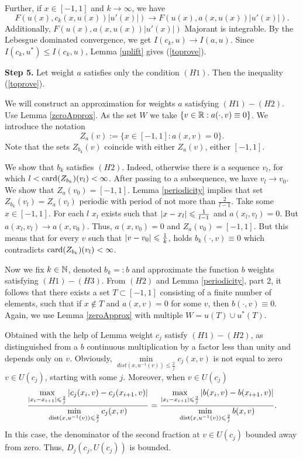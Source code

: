 Further, if $x \in [-1, 1]$ and $k \to \infty$, we have
$$F(u(x), c_k(x, u(x)) |u'(x)|) \to F(u(x), a(x, u(x)) |u'(x)|).$$
Additionally, $F(u(x), a(x, u(x)) |u'(x)|)$ Majorant is integrable.
By the Lebesgue dominated convergence, we get $I(c_k, u) \to I(a, u)$.
Since $I(c_k, u^*) \le I(c_k, u)$, Lemma \ref{uplift} gives (\ref{toprove}).

\bigskip
{\bf Step 5.} Let weight $a$ satisfies only the condition $(H1)$.
Then the inequality (\ref{toprove}).

We will construct an approximation for weights $a$ satisfying $(H1)-(H2)$.
Use Lemma \ref{zeroApprox}.
As the set $W$ we take $\{ v \in \mathbb R: a(\cdot, v) \equiv 0 \}$.
We introduce the notation $$Z_a(v) := \{ x \in [-1, 1]: a(x, v) = 0 \}.$$
Note that the sets $Z_{b_k}(v)$ coincide with either $Z_a(v)$, either $[-1, 1]$.

We show that $b_k$ satisfies $(H2)$.
Indeed, otherwise there is a sequence $v_l$, for which
$l < {\rm card}(Z_{b_k})(v_l) < \infty$.
After passing to a subsequence, we have $v_l \to v_0$.
We show that $Z_a(v_0) = [-1, 1]$. Lemma \ref{periodicity} implies that
set $Z_{b_k}(v_l) = Z_a(v_l)$ periodic with period of not more than $\frac{2}{l - 1}$.
Take some $x \in [-1, 1]$. For each $l$ $x_l$ exists such that
$\abs{x - x_l} \le \frac{1}{l - 1}$ and $a(x_l, v_l) = 0$.
But $a(x_l, v_l) \to a(x, v_0)$.
Thus, $a(x, v_0) = 0$ and $Z_a(v_0) = [-1, 1]$.
But this means that for every $v$ such
that $\abs{v - v_0} \le \frac{1}{k}$, holds $b_k(\cdot, v) \equiv 0$
which contradicts ${\rm card}(Z_{b_k})(v_l) < \infty$.


Now we fix $k \in \mathbb N$, denoted $b_k =: b$
and approximate the function $b$ weights satisfying $(H1)-(H3)$.
From $(H2)$ and Lemma \ref{periodicity}, part 2, it follows that there exists a set $T \subset [-1, 1]$
consisting of a finite number of elements, such that
if $x \not \in T$ and $a(x, v) = 0$ for some $v$, then $b(\cdot, v) \equiv 0$.
Again, we use Lemma \ref{zeroApprox} with multiple
$W = u(T) \cup u^*(T)$.

Obtained with the help of Lemma weight $c_j$ satisfy $(H1)-(H2)$, as distinguished from a $b$
continuous multiplication by a factor less than unity and depends only on $v$.
Obviously, $\min\limits_{dist(x, u^{-1}(v)) \le \frac{2}{j}} c_j(x, v)$ is not equal to zero
$v \in U(c_j)$, starting with some $j$.
Moreover, when $v \in U(c_j)$
$$
\frac{\max\limits_{\abs{x_i - x_{i + 1}} \le \frac{2}{j}} \abs{c_j(x_i, v) - c_j(x_{i + 1}, v)}}
{\min\limits_{\dist(x, u^{-1}(v)) \le \frac{2}{j}} c_j(x, v)}
=\frac{\max\limits_{\abs{x_i - x_{i + 1}} \le \frac{2}{j}} \abs{b(x_i, v) - b(x_{i + 1}, v)}}
{\min\limits_{\dist(x, u^{-1}(v)) \le \frac{2}{j}} b(x, v)}.
$$
In this case, the denominator of the second fraction at $v \in U(c_j)$ bounded away from zero.
Thus, $D_j(c_j, U(c_j))$ is bounded.

